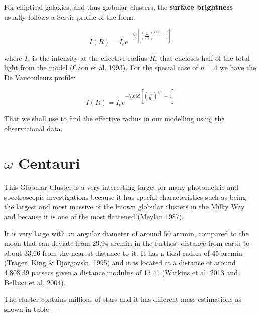 For elliptical galaxies, and thus globular clusters, the \textbf{surface brightness} usually follows a Sersic profile of the form: 

\begin{equation}
I(R)=I_{e}e^{-b_{n}\left[\left(\frac{R}{R_{e}}\right)^{1/n}-1\right]}
\end{equation}

where $I_{e}$ is the intensity at the effective radius $R_{e}$ that encloses half of the total light from the model (Caon et al. 1993). For the special case of $n=4$ we have the De Vaucouleurs profile:

\begin{equation}
I(R)=I_{e}e^{-7.669\left[\left(\frac{R}{R_{e}}\right)^{1/4}-1\right]}
\end{equation}

That we shall use to find the effective radius in our modelling using the observational data.

\section{$\omega$ Centauri}

This Globular Cluster is a very interesting target for many photometric and spectroscopic investigations because it has special characteristics such as being the largest and most massive of the known globular clusters in the Milky Way and because it is one of the most flattened (Meylan 1987).

It is very large with an angular diameter of around 50 arcmin, compared to the moon that can deviate from 29.94 arcmin in the furthest distance from earth to about 33.66 from the nearest distance to it. It has a tidal radius of 45 arcmin (Trager, King \& Djorgovski, 1995) and it is located at a distance of around 4,808.39 parsecs given a distance modulus of 13.41 (Watkins et al. 2013 and Bellazii et al. 2004).

The cluster contains millions of stars and it has different mass estimations as shown in table ----

